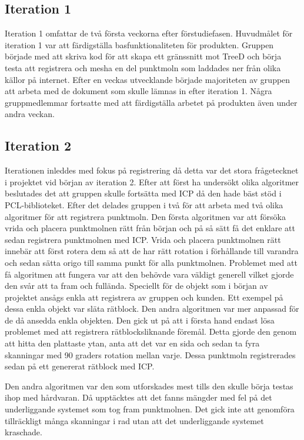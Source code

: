 \subsection{Iteration 1}

Iteration 1 omfattar de två första veckorna efter förstudiefasen. Huvudmålet för iteration 1 var att färdigställa basfunktionaliteten för produkten. Gruppen började med att skriva kod för att skapa ett gränssnitt mot TreeD och börja testa att registrera och mesha en del punktmoln som laddades ner från olika källor på internet. Efter en veckas utvecklande började majoriteten av gruppen att arbeta med de dokument som skulle lämnas in efter iteration 1. Några gruppmedlemmar fortsatte med att färdigställa arbetet på produkten även under andra veckan.

\subsection{Iteration 2}

Iterationen inleddes med fokus på registrering då detta var det stora frågetecknet i projektet vid början av iteration 2. Efter att först ha undersökt olika algoritmer beslutades det att gruppen skulle fortsätta med ICP då den hade bäst stöd i PCL-biblioteket. Efter det delades gruppen i två för att arbeta med två olika algoritmer för att registrera punktmoln. Den första algoritmen var att försöka vrida och placera punktmolnen rätt från början och på så sätt få det enklare att sedan registrera punktmolnen med ICP. Vrida och placera punktmolnen rätt innebär att först rotera dem så att de har rätt rotation i förhållande till varandra och sedan sätta origo till samma punkt för alla punktmolnen. Problemet med att få algoritmen att fungera var att den behövde vara väldigt generell vilket gjorde den svår att ta fram och fullända. Speciellt för de objekt som i början av projektet ansågs enkla att registrera av gruppen och kunden. Ett exempel på dessa enkla objekt var släta rätblock. Den andra algoritmen var mer anpassad för de då ansedda enkla objekten. Den gick ut på att i första hand endast lösa problemet med att registrera rätblocksliknande föremål. Detta gjorde den genom att hitta den plattaste ytan, anta att det var en sida och sedan ta fyra skanningar med 90 graders rotation mellan varje. Dessa punktmoln registrerades sedan på ett genererat rätblock med ICP.

Den andra algoritmen var den som utforskades mest tills den skulle börja testas ihop med hårdvaran. Då upptäcktes att det fanns mängder med fel på det underliggande systemet som tog fram punktmolnen. Det gick inte att genomföra tillräckligt många skanningar i rad utan att det underliggande systemet kraschade.

